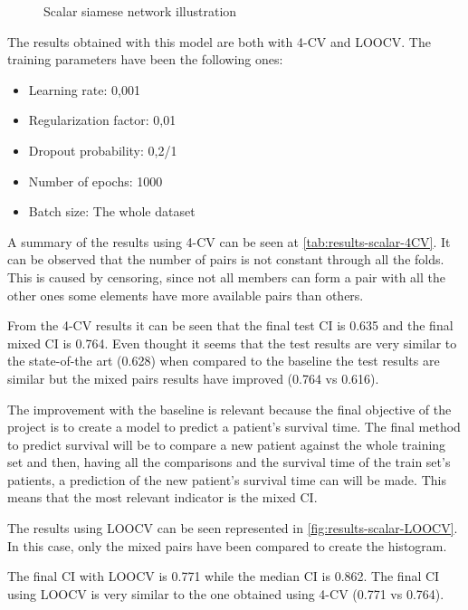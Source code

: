 \begin{figure}
  \centering
  
  \caption{Scalar siamese network illustration \label{fig:scalar-implement}}
\end{figure}


The results obtained with this model are both with 4-CV and \gls{LOOCV}. The training 
parameters have been the following ones:
\begin{itemize}
  \item Learning rate: 0,001
  \item Regularization factor: 0,01
  \item Dropout probability: 0,2/1
  \item Number of epochs: 1000
  \item Batch size: The whole dataset
\end{itemize}

A summary of the results using 4-CV can be seen at \autoref{tab:results-scalar-4CV}. It can be
observed that the number of pairs is not constant through all the folds. This is caused by
censoring, since not all members can form a pair with all the other ones some elements 
have more available pairs than others. 

From the 4-CV results it can be seen that the final test \gls{CI} is 0.635 and the final mixed 
\gls{CI} is 0.764. Even thought it seems that the test results are very similar to the
state-of-the art (0.628) when compared to the baseline the test results are similar but
the mixed pairs results have improved (0.764 vs 0.616).

The improvement with the baseline is relevant because the final objective of the project
is to create a model to predict a patient's survival time. The final method to predict
survival will be to compare a new patient against the whole training set and then, having
all the comparisons and the survival time of the train set's patients, a prediction of
the new patient's survival time can will be made. This means that the most relevant 
indicator is the mixed \gls{CI}.

The results using \gls{LOOCV} can be seen represented in \autoref{fig:results-scalar-LOOCV}. 
In this case, only the mixed pairs have been compared to create the histogram.

The final \gls{CI} with \gls{LOOCV} is 0.771 while the median \gls{CI} is 0.862. The final 
\gls{CI} using \gls{LOOCV} is very similar to the one obtained using 4-CV (0.771 vs 0.764).

